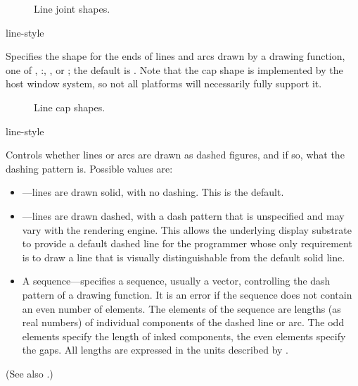 \begin{figure}
\ifpsfig\centerline{}\else\vspace{1.25in}\fi
\caption{Line joint shapes.}
\end{figure}

 {line-style}

Specifies the shape for the ends of lines and arcs drawn by a drawing function,
one of , :, , or ; the default
is .  Note that the cap shape is implemented by the host window
system, so not all platforms will necessarily fully support it.

\begin{figure}
\ifpsfig\centerline{}\else\vspace{1.75in}\fi
\caption{Line cap shapes.}
\end{figure}

 {line-style}

Controls whether lines or arcs are drawn as dashed figures, and if so, what the
dashing pattern is.  Possible values are:

\begin{itemize}
\item {}---lines are drawn solid, with no dashing.  This is the default.

\item {}---lines are drawn dashed, with a dash pattern that is unspecified
and may vary with the rendering engine.  This allows the underlying display
substrate to provide a default dashed line for the programmer whose only
requirement is to draw a line that is visually distinguishable from the default
solid line.

\item A sequence---specifies a sequence, usually a vector, controlling the dash
pattern of a drawing function.  It is an error if the sequence does not contain
an even number of elements.  The elements of the sequence are lengths (as real
numbers) of individual components of the dashed line or arc.  The odd elements
specify the length of inked components, the even elements specify the gaps.  All
lengths are expressed in the units described by .
\end{itemize}

(See also .)

